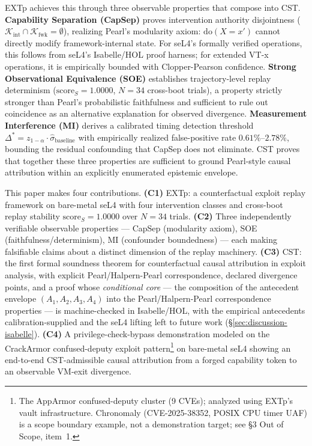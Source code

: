 \documentclass[conference]{IEEEtran}
\newcommand{\Kint}{\mathcal{K}_\text{int}}
\newcommand{\Kfwk}{\mathcal{K}_\text{fwk}}
\newcommand{\sigbase}{\hat{\sigma}_\text{baseline}}
\newcommand{\Dstar}{\Delta^{*}}
\newcommand{\scoreS}{\text{score}_S}
\newcommand{\dox}[1]{\text{do}(X{=}#1)}
\begin{document}
EXTp achieves this through three observable properties that compose
into CST. \textbf{Capability Separation (CapSep)} proves intervention
authority disjointness ($\Kint \cap \Kfwk = \emptyset$), realizing
Pearl's modularity axiom: $\dox{x'}$ cannot directly modify
framework-internal state. For seL4's formally verified operations,
this follows from seL4's Isabelle/HOL proof harness; for extended
VT-x operations, it is empirically bounded with Clopper-Pearson
confidence. \textbf{Strong Observational Equivalence (SOE)}
establishes trajectory-level replay determinism
($\scoreS = 1.0000$, $N{=}34$ cross-boot trials), a property strictly
stronger than Pearl's probabilistic faithfulness and sufficient to
rule out coincidence as an alternative explanation for observed
divergence. \textbf{Measurement Interference (MI)} derives a
calibrated timing detection threshold $\Dstar = z_{1-\alpha} \cdot
\sigbase$ with empirically realized false-positive rate
$0.61\%$--$2.78\%$, bounding the residual confounding that CapSep
does not eliminate. CST proves that together these three properties
are sufficient to ground Pearl-style causal attribution within an
explicitly enumerated epistemic envelope.

This paper makes four contributions.
\textbf{(C1)} EXTp: a counterfactual exploit replay framework on
bare-metal seL4 with four intervention classes and cross-boot replay
stability $\scoreS = 1.0000$ over $N{=}34$ trials.
\textbf{(C2)} Three independently verifiable observable properties
--- CapSep (modularity axiom), SOE (faithfulness/determinism), MI
(confounder boundedness) --- each making falsifiable claims about a
distinct dimension of the replay machinery.
\textbf{(C3)} CST: the first formal soundness theorem for
counterfactual causal attribution in exploit analysis, with explicit
Pearl/Halpern-Pearl correspondence, declared divergence points, and a
proof whose \emph{conditional core} --- the composition of the
antecedent envelope $(A_1, A_2, A_3, A_4)$ into the Pearl/Halpern-Pearl
correspondence properties --- is machine-checked in Isabelle/HOL, with
the empirical antecedents calibration-supplied and the seL4 lifting
left to future work (\S\ref{sec:discussion-isabelle}).
\textbf{(C4)} A privilege-check-bypass demonstration modeled on the
CrackArmor confused-deputy exploit pattern\footnote{The AppArmor
confused-deputy cluster (9 CVEs); analyzed using EXTp's vault
infrastructure. Chronomaly (CVE-2025-38352, POSIX CPU timer UAF) is
a scope boundary example, not a demonstration target; see \S3 Out of
Scope, item~1.} on bare-metal seL4 showing an end-to-end
CST-admissible causal attribution from a forged capability token to
an observable VM-exit divergence.
\end{document}
